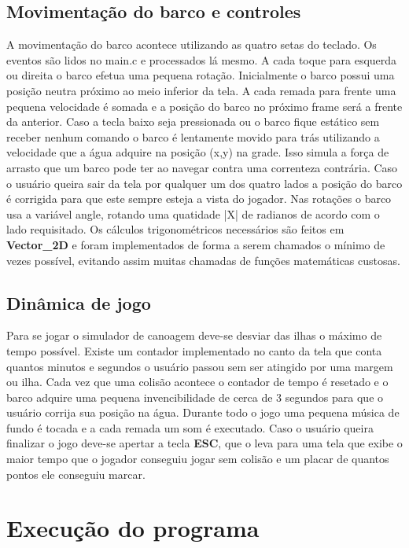 \documentclass[a4paper,11pt]{article}
\begin{document}
\subsection{Movimenta\c{c}ão do barco e controles}
A movimenta\c{c}ão do barco acontece utilizando as quatro setas do teclado. Os eventos são lidos no main.c e processados lá mesmo. A cada toque para esquerda ou direita o barco efetua uma pequena rota\c{c}ão. Inicialmente o barco possui uma posi\c{c}ão neutra próximo ao meio inferior da tela. A cada remada para frente uma pequena velocidade é somada e a posi\c{c}ão do barco no próximo frame será a frente da anterior. Caso a tecla baixo seja pressionada ou o barco fique estático sem receber nenhum comando o barco é lentamente movido para trás utilizando a velocidade que a água adquire na posi\c{c}ão (x,y) na grade. Isso simula a for\c{c}a de arrasto que um barco pode ter ao navegar contra uma correnteza contrária.
Caso o usuário queira sair da tela por qualquer um dos quatro lados a posi\c{c}ão do barco é corrigida para que este sempre esteja a vista do jogador. Nas rota\c{c}ões o barco usa a variável angle, rotando uma quatidade |X| de radianos de acordo com o lado requisitado. Os cálculos trigonométricos necessários são feitos em \textbf{Vector\_2D} e foram implementados de forma a serem chamados o mínimo de vezes possível, evitando assim muitas chamadas de fun\c{c}ões matemáticas custosas.


\subsection{Dinâmica de jogo}
Para se jogar o simulador de canoagem deve-se desviar das ilhas o máximo de tempo possível. Existe um contador implementado no canto da tela que conta quantos minutos e segundos o usuário passou sem ser atingido por uma margem ou ilha. Cada vez que uma colisão acontece o contador de tempo é resetado e o barco adquire uma pequena invencibilidade de cerca de 3 segundos para que o usuário corrija sua posi\c{c}ão na água. Durante todo o jogo uma pequena música de fundo é tocada e a cada remada um som é executado.
Caso o usuário queira finalizar o jogo deve-se apertar a tecla \textbf{ESC}, que o leva para uma tela que exibe o maior tempo que o jogador conseguiu jogar sem colisão e um placar de quantos pontos ele conseguiu marcar.

\section{Execu\c{c}ão do programa}
\end{document}
